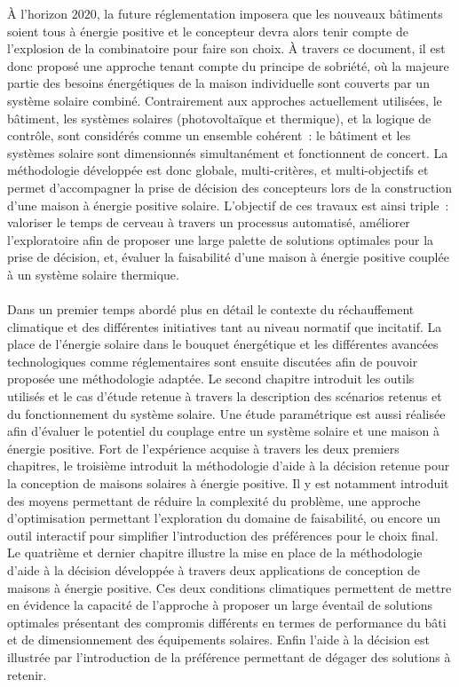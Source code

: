 À l’horizon $2020$, la future réglementation imposera que les nouveaux bâtiments soient
tous à énergie positive et le concepteur devra alors tenir compte de l’explosion de la
combinatoire pour faire son choix. À travers ce document, il est donc proposé une approche
tenant compte du principe de sobriété, où la majeure partie des besoins énergétiques de la
maison individuelle sont couverts par un système solaire combiné. Contrairement aux
approches actuellement utilisées, le bâtiment, les systèmes solaires (photovoltaïque et
thermique), et la logique de contrôle, sont considérés comme un ensemble cohérent~: le
bâtiment et les systèmes solaire sont dimensionnés simultanément et fonctionnent de
concert. La méthodologie développée est donc globale, multi-critères, et multi-objectifs
et permet d’accompagner la prise de décision des concepteurs lors de la construction d’une
maison à énergie positive solaire. L’objectif de ces travaux est ainsi triple~: valoriser
le temps de cerveau à travers un processus automatisé, améliorer l’exploratoire afin de
proposer une large palette de solutions optimales pour la prise de décision, et, évaluer
la faisabilité d’une maison à énergie positive couplée à un système solaire thermique.


\paragraph{} %
Dans un premier temps abordé plus en détail le contexte du réchauffement
climatique et des différentes initiatives tant au niveau normatif que incitatif. La place
de l’énergie solaire dans le bouquet énergétique et les différentes avancées technologiques
comme réglementaires sont ensuite discutées afin de pouvoir proposée une méthodologie
adaptée. Le second chapitre introduit les outils utilisés et le cas d’étude retenue à
travers la description des scénarios retenus et du fonctionnement du système solaire. Une
étude paramétrique est aussi réalisée afin d’évaluer le potentiel du couplage entre un
système solaire et une maison à énergie positive. Fort de l’expérience acquise à travers
les deux premiers chapitres, le troisième introduit la méthodologie d’aide à la décision
retenue pour la conception de maisons solaires à énergie positive. Il y est notamment
introduit des moyens permettant de réduire la complexité du problème, une approche
d’optimisation permettant l’exploration du domaine de faisabilité, ou encore un outil
interactif pour simplifier l’introduction des préférences pour le choix final. Le
quatrième et dernier chapitre illustre la mise en place de la méthodologie d’aide à la
décision développée à travers deux applications de conception de maisons à énergie
positive. Ces deux conditions climatiques permettent de mettre en évidence la capacité de
l’approche à proposer un large éventail de solutions optimales présentant des compromis
différents en termes de performance du bâti et de dimensionnement des équipements
solaires. Enfin l’aide à la décision est illustrée par l’introduction de la préférence
permettant de dégager des solutions à retenir.
